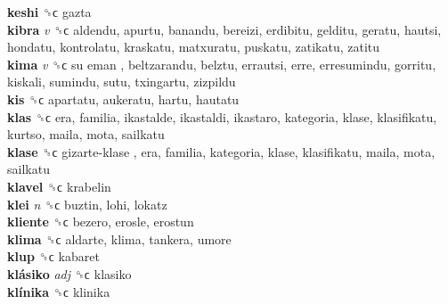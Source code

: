 \textbf{keshi} ␝ϲ  gazta  \\
\textbf{kibra} \emph{v}  ␝ϲ  aldendu, apurtu, banandu, bereizi, erdibitu, gelditu, geratu, hautsi, hondatu, kontrolatu, kraskatu, matxuratu, puskatu, zatikatu, zatitu  \\
\textbf{kima} \emph{v}  ␝ϲ   su eman , beltzarandu, belztu, errautsi, erre, erresumindu, gorritu, kiskali, sumindu, sutu, txingartu, zizpildu  \\
\textbf{kis} ␝ϲ  apartatu, aukeratu, hartu, hautatu  \\
\textbf{klas} ␝ϲ  era, familia, ikastalde, ikastaldi, ikastaro, kategoria, klase, klasifikatu, kurtso, maila, mota, sailkatu  \\
\textbf{klase} ␝ϲ   gizarte-klase , era, familia, kategoria, klase, klasifikatu, maila, mota, sailkatu  \\
\textbf{klavel} ␝ϲ  krabelin  \\
\textbf{klei} \emph{n}  ␝ϲ  buztin, lohi, lokatz  \\
\textbf{kliente} ␝ϲ  bezero, erosle, erostun  \\
\textbf{klima} ␝ϲ  aldarte, klima, tankera, umore  \\
\textbf{klup} ␝ϲ  kabaret  \\
\textbf{klásiko} \emph{adj}  ␝ϲ  klasiko  \\
\textbf{klínika} ␝ϲ  klinika  \\
